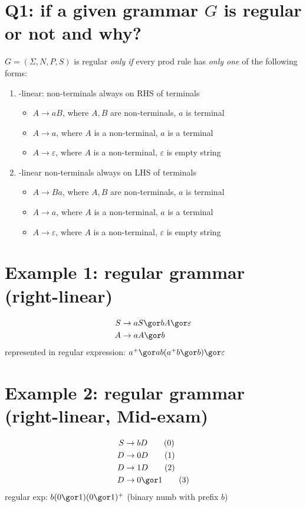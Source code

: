 \section*{Q1: if a given grammar $G$ is regular or not and why?}
$G=(\Sigma,N,P,S)$ is regular \emph{only if} every prod rule has \emph{only one} of the following forms:
\begin{enumerate}
\item {}-linear: non-terminals always on RHS of terminals
  \begin{itemize}
  \item $A\to aB$, where $A, B$ are non-terminals, $a$ is terminal
  \item $A\to a$, where $A$ is a non-terminal, $a$ is a terminal
  \item $A\to \varepsilon$, where $A$ is a non-terminal, $\varepsilon$ is empty string
  \end{itemize}
\item {}-linear non-terminals always on LHS of terminals
  \begin{itemize}
  \item $A\to Ba$, where $A, B$ are non-terminals, $a$ is terminal
  \item $A\to a$, where $A$ is a non-terminal, $a$ is a terminal
  \item $A\to \varepsilon$, where $A$ is a non-terminal, $\varepsilon$ is empty string
  \end{itemize}
\end{enumerate}
\section*{Example 1: regular grammar (right-linear)}
\begin{align*}
  S&\to aS \gor bA \gor \varepsilon\\
  A&\to aA \gor b
\end{align*}
represented in regular expression: $a^+\gor ab(a^+b\gor b)\gor\varepsilon$
\section*{Example 2: regular grammar (right-linear, Mid-exam)}
\begin{align*}
  S&\to bD \tag{0} \\
  D&\to 0D \tag{1} \\
  D&\to 1D \tag{2} \\
  D&\to 0 \gor 1 \tag{3}
\end{align*}
regular exp: $b(0\gor 1)(0\gor 1)^+$ (binary numb with prefix $b$)

